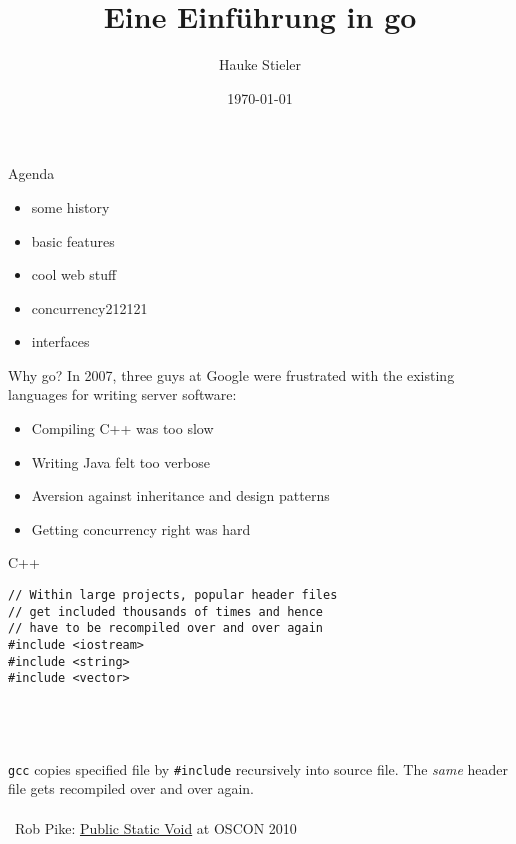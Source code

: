 \documentclass[10pt]{beamer}
\author{Hauke Stieler}
\title{Eine Einführung in go}
\date{\footnotesize \today}
\institute{Fachbereich Informatik der Universität Hamburg}\titlegraphic{\hfill\texttt{[image: images/gopher\\inv]}}
\begin{document}
	\maketitle
	
	
	\begin{frame}{Agenda}
		\begin{itemize}
			\item some history
			\item basic features
			\item cool web stuff
			\item concurrency212121
			\item interfaces
		\end{itemize}
	\end{frame}


	\begin{frame}{Why go?}
		In 2007, three guys at Google were frustrated with the existing languages for writing server software:
		\begin{itemize}
			\item Compiling C++ was too slow
			\item Writing Java felt too verbose
			\item Aversion against inheritance and design patterns
			\item Getting concurrency right was hard
		\end{itemize}
	\end{frame}


	\begin{frame}[fragile]{C++}
		\begin{verbatim}
// Within large projects, popular header files
// get included thousands of times and hence
// have to be recompiled over and over again
#include <iostream>
#include <string>
#include <vector>
		\end{verbatim}
		\\\\\\
		\pause
		\texttt{gcc} copies specified file by \texttt{#include} recursively into source file. The \textit{same} header file gets recompiled over and over again.\\
		\hfill\\
		\textrightarrow ~Rob Pike: \href{https://www.youtube.com/watch?v=5kj5ApnhPAE}{Public Static Void} at OSCON 2010
		\vfill
\end{frame}
\end{document}
